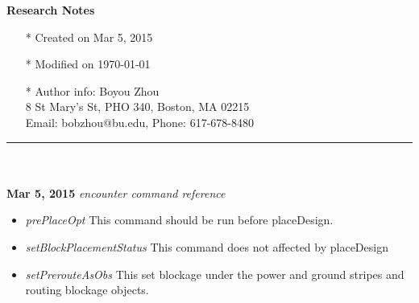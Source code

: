\documentclass[]{article}
\begin{document}
\pagestyle{empty}
{\large\textbf{Research Notes}}
\begin{itemize}
    \item[*] Created on Mar 5, 2015
    \item[*] Modified on \today
    \item[*] Author info: Boyou Zhou\\
             8 St Mary's St, PHO 340, Boston, MA 02215\\
             Email: bobzhou@bu.edu, Phone: 617-678-8480
\end{itemize}


\rule[-0.1cm]{7.5in}{0.01cm}\\
\\
\noindent \textbf{Mar 5, 2015}
\textit{encounter command reference}
\indent		\begin{itemize}
            \item \textit{prePlaceOpt} This command should be run before
            placeDesign.
            \item \textit{setBlockPlacementStatus} This command does not
            affected by placeDesign
            \item \textit{setPrerouteAsObs} This set blockage under the power
            and ground stripes and routing blockage objects.

        \end{itemize}
\end{document}

